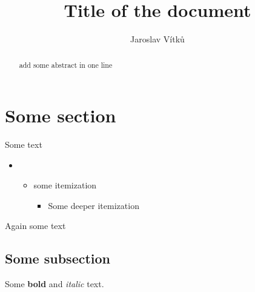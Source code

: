 \documentclass[journal,onecolumn]{IEEEtrancz}
\begin{document}
\title{Title of the document}
\author{Jaroslav Vítků}

\maketitle

\begin{abstract}
 	add some abstract in one line
\end{abstract}

\IEEEpeerreviewmaketitle


\section{Some section}
Some text
\begin{itemize}
	\item 
	\begin{itemize}
		\item some itemization
		\begin{itemize}
			\item Some deeper itemization
		\end{itemize}
	\end{itemize}
\end{itemize}
Again some text
\subsection{Some subsection}
Some \textbf{bold} and \textit{italic} text.
\end{document}
